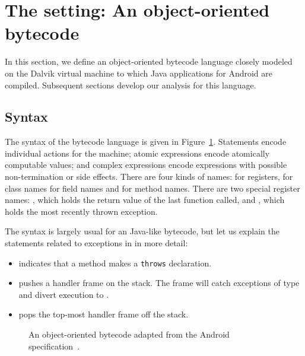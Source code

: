 \section{The setting: An object-oriented bytecode} \label{sec:syntax}

In this section, we define an object-oriented bytecode
language 
closely modeled on the Dalvik virtual machine
to which Java applications for Android are compiled.
Subsequent sections develop our analysis for this language.

\subsection{Syntax}

The syntax of the bytecode language is given in Figure~\ref{fig:oo-syntax}.
Statements encode individual actions for the machine;
atomic expressions encode atomically computable values;
and complex expressions encode expressions with possible 
non-termination or side effects.
There are four kinds of names:
 for registers,  for class names
 for field names
and  for method names.
There are two special register names:
, which holds the return value of the last function called,
and , which holds the most recently thrown exception.

The syntax is largely usual for an Java-like bytecode, but let us
explain the statements related to exceptions in
 in more detail:

\begin{itemize}
\item 
indicates that a  method makes a
\texttt{throws} declaration.




\item   pushes a handler frame on the stack.
The frame will catch exceptions of type  
and divert execution to .

\item

pops the top-most handler frame off the stack.


\end{itemize}




\begin{figure}
 
\caption{An object-oriented bytecode adapted from the Android specification~\cite{local:androidbytecode:url}.}



\label{fig:oo-syntax}
\end{figure}
 
